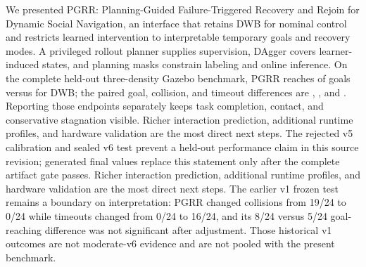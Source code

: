 We presented PGRR: Planning-Guided Failure-Triggered Recovery and Rejoin for
Dynamic Social Navigation, an interface that retains DWB for nominal control
and restricts learned intervention to interpretable temporary goals and
recovery modes.  A privileged rollout planner supplies supervision, DAgger
covers learner-induced states, and planning masks constrain labeling and online
inference.
\ifmoderateresults
On the complete held-out three-density Gazebo benchmark, PGRR reaches
\ModeratePGRRSuccessRate{} of goals versus \ModerateBaseSuccessRate{} for DWB;
the paired goal, collision, and timeout differences are
\ModeratePGRRSuccessDifference{}, \ModeratePGRRCollisionDifference{}, and
\ModeratePGRRTimeoutDifference{}.  Reporting those endpoints separately keeps
task completion, contact, and conservative stagnation visible.  Richer
interaction prediction, additional runtime profiles, and hardware validation
are the most direct next steps.
\else
The rejected v5 calibration and sealed v6 test prevent a held-out performance
claim in this source revision; generated final values replace this statement
only after the complete artifact gate passes.  Richer interaction prediction,
additional runtime profiles, and hardware validation are the most direct next
steps.
\fi
The earlier v1 frozen test remains a boundary on interpretation: PGRR changed
collisions from 19/24 to 0/24 while timeouts changed from 0/24 to 16/24, and its
8/24 versus 5/24 goal-reaching difference was not significant after adjustment.
Those historical v1 outcomes are not moderate-v6 evidence and are not pooled
with the present benchmark.
